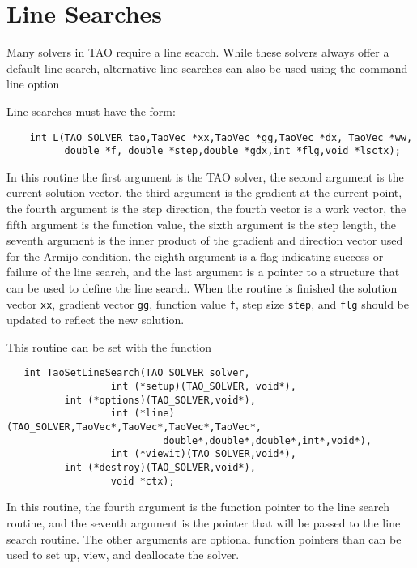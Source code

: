 \section{Line Searches} 
\label{sec:TaoLineSearch}

Many solvers in TAO require a line search.  While these solvers always
offer a default line search, alternative line searches can also be used
using the command line option 


Line searches must have the form:
\begin{verbatim}
    int L(TAO_SOLVER tao,TaoVec *xx,TaoVec *gg,TaoVec *dx, TaoVec *ww,
          double *f, double *step,double *gdx,int *flg,void *lsctx);
\end{verbatim}
In this routine the first argument is the TAO solver, the second argument
is the current solution vector, the third argument is the gradient at
the current point, the fourth argument is the step direction, the fourth
vector is a work vector, the fifth argument is the function value, the
sixth argument is the step length, the seventh argument is the inner
product of the gradient and direction vector used for the Armijo condition,
the eighth argument is a flag indicating success or
failure of the line search, and the last argument is a pointer to
a structure that can be used to define the line search.  When the 
routine is finished the solution vector {\tt xx}, gradient vector {\tt gg}, 
function value {\tt f}, step size {\tt step}, and {\tt flg} should be
updated to reflect the new solution.

This routine can be set with the function 
\begin{verbatim}
   int TaoSetLineSearch(TAO_SOLVER solver, 
                  int (*setup)(TAO_SOLVER, void*),
		  int (*options)(TAO_SOLVER,void*),
                  int (*line)(TAO_SOLVER,TaoVec*,TaoVec*,TaoVec*,TaoVec*,
                           double*,double*,double*,int*,void*),
                  int (*viewit)(TAO_SOLVER,void*),
		  int (*destroy)(TAO_SOLVER,void*),
                  void *ctx);
\end{verbatim}
\noindent
In this routine, the fourth argument is the function pointer to the line
search routine, and the seventh argument is the pointer that will be passed
to the line search routine.  The other arguments are optional function 
pointers than can be used to set up, view, and deallocate the solver.

